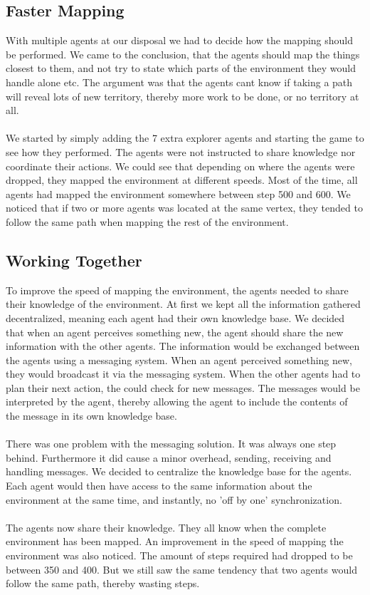 \documentclass[11pt]{report}
\begin{document}
\subsection*{Faster Mapping}
With multiple agents at our disposal we had to decide how the mapping should be performed. We came to the conclusion, that the agents should map the things closest to them, and not try to state which parts of the environment they would handle alone etc. The argument was that the agents cant know if taking a path will reveal lots of new territory, thereby more work to be done, or no territory at all.\\
\\
We started by simply adding the 7 extra explorer agents and starting the game to see how they performed. The agents were not instructed to share knowledge nor coordinate their actions. We could see that depending on where the agents were dropped, they mapped the environment at different speeds. Most of the time, all agents had mapped the environment somewhere between step 500 and 600. We noticed that if two or more agents was located at the same vertex, they tended to follow the same path when mapping the rest of the environment.

\subsection*{Working Together}
To improve the speed of mapping the environment, the agents needed to share their knowledge of the environment. At first we kept all the information gathered decentralized, meaning each agent had their own knowledge base. We decided that when an agent perceives something new, the agent should share the new information with the other agents. The information would be exchanged between the agents using a messaging system. When an agent perceived something new, they would broadcast it via the messaging system. When the other agents had to plan their next action, the could check for new messages. The messages would be interpreted by the agent, thereby allowing the agent to include the contents of the message in its own knowledge base.\\
\\
There was one problem with the messaging solution. It was always one step behind. Furthermore it did cause a minor overhead, sending, receiving and handling messages. We decided to centralize the knowledge base for the agents. Each agent would then have access to the same information about the environment at the same time, and instantly, no 'off by one' synchronization.\\
\\
The agents now share their knowledge. They all know when the complete environment has been mapped. An improvement in the speed of mapping the environment was also noticed. The amount of steps required had dropped to be between 350 and 400. But we still saw the same tendency that two agents would follow the same path, thereby wasting steps.
\end{document}
